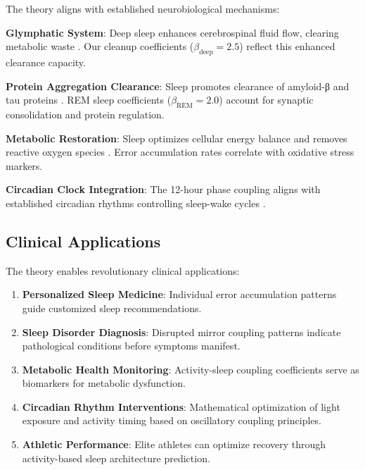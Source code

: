\documentclass[12pt]{article}
\begin{document}
The theory aligns with established neurobiological mechanisms:

\textbf{Glymphatic System}: Deep sleep enhances cerebrospinal fluid flow, clearing metabolic waste \citep{xie2013sleep}. Our cleanup coefficients ($\beta_{\text{deep}} = 2.5$) reflect this enhanced clearance capacity.

\textbf{Protein Aggregation Clearance}: Sleep promotes clearance of amyloid-β and tau proteins \citep{kang2013amyloid}. REM sleep coefficients ($\beta_{\text{REM}} = 2.0$) account for synaptic consolidation and protein regulation.

\textbf{Metabolic Restoration}: Sleep optimizes cellular energy balance and removes reactive oxygen species \citep{bellesi2015effects}. Error accumulation rates correlate with oxidative stress markers.

\textbf{Circadian Clock Integration}: The 12-hour phase coupling aligns with established circadian rhythms controlling sleep-wake cycles \citep{takahashi2017transcriptional}.

\subsection{Clinical Applications}

The theory enables revolutionary clinical applications:

\begin{enumerate}
\item \textbf{Personalized Sleep Medicine}: Individual error accumulation patterns guide customized sleep recommendations.

\item \textbf{Sleep Disorder Diagnosis}: Disrupted mirror coupling patterns indicate pathological conditions before symptoms manifest.

\item \textbf{Metabolic Health Monitoring}: Activity-sleep coupling coefficients serve as biomarkers for metabolic dysfunction.

\item \textbf{Circadian Rhythm Interventions}: Mathematical optimization of light exposure and activity timing based on oscillatory coupling principles.

\item \textbf{Athletic Performance}: Elite athletes can optimize recovery through activity-based sleep architecture prediction.
\end{enumerate}
\end{document}
